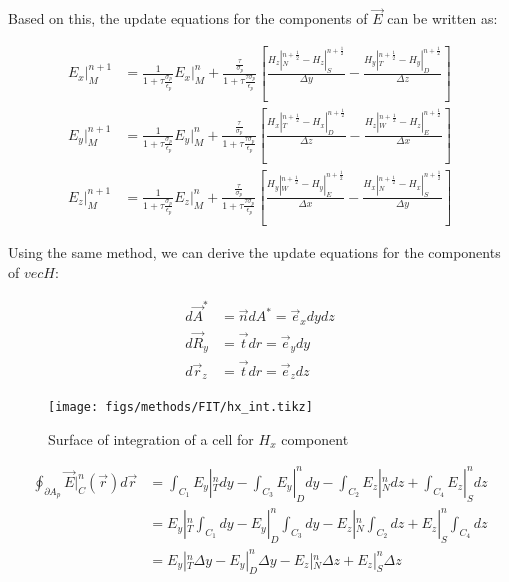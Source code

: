             Based on this, the update equations for the components of $\vec{E}$ can be written as:

            \begin{align}
                E_x|_M^{n+1} &= \frac{1}{1+\tau\frac{\sigma_p}{\epsilon_p}}E_x|_M^n
                    + \frac{\frac{\tau}{\sigma_p}}{1+\tau\frac{\tau\sigma_p}{\epsilon_p}}\left[\frac{H_z|_N^{n+\frac{1}{2}}-H_z|_S^{n+\frac{1}{2}}}{\Delta y}
                    - \frac{H_y|_T^{n+\frac{1}{2}} - H_y|_D^{n+\frac{1}{2}}}{\Delta z}\right]\\
                E_y|_M^{n+1} &= \frac{1}{1+\tau\frac{\sigma_p}{\epsilon_p}}E_y|_M^n
                    + \frac{\frac{\tau}{\sigma_p}}{1+\tau\frac{\tau\sigma_p}{\epsilon_p}}\left[\frac{H_x|_T^{n+\frac{1}{2}}-H_x|_D^{n+\frac{1}{2}}}{\Delta z}
                    - \frac{H_z|_W^{n+\frac{1}{2}} - H_z|_E^{n+\frac{1}{2}}}{\Delta x}\right]\\
                E_z|_M^{n+1} &= \frac{1}{1+\tau\frac{\sigma_p}{\epsilon_p}}E_z|_M^n
                    + \frac{\frac{\tau}{\sigma_p}}{1+\tau\frac{\tau\sigma_p}{\epsilon_p}}\left[\frac{H_y|_W^{n+\frac{1}{2}}-H_y|_E^{n+\frac{1}{2}}}{\Delta x}
                    - \frac{H_x|_N^{n+\frac{1}{2}} - H_x|_S^{n+\frac{1}{2}}}{\Delta y}\right]
            \end{align}

            Using the same method, we can derive the update equations for the components of $vec{H}$:

            \begin{align}
                d\vec{A}^* &= \vec{n}dA^* = \vec{e}_xdydz \\
                d\vec{R}_y &= \vec{t}dr = \vec{e}_ydy \\
                d\vec{r}_z &= \vec{t}dr = \vec{e}_zdz
            \end{align}

            \begin{figure}
                \centering
                \texttt{[image: figs/methods/FIT/hx\_int.tikz]}
                \caption{Surface of integration of a cell for $H_x$ component}
                \label{fig:Hx_Int}
            \end{figure}


            \begin{align}
                \oint_{\partial A_p} \vec{E}|_{C}^{n}(\vec{r})d\vec{r} &= \int_{C_1}E_y|_{T}^ndy
                        - \int_{C_3}E_y|_{D}^{n}dy - \int_{C_2}E_z|_{N}^{n}dz + \int_{C_4}E_z|_S^ndz \\
                        &= E_y|_T^n\int_{C_1}dy - E_y|_D^n\int_{C_3}dy - E_z|_N^n\int_{C_2}dz + E_z|_S^n\int_{C_4}dz\\
                        &= E_y|_T^n\Delta y - E_y|_D^n\Delta y - E_z|_N^n \Delta z + E_z|_S^n \Delta z
            \end{align}

